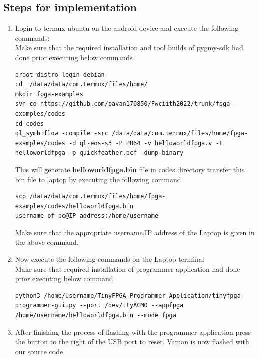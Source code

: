 \documentclass[10pt, a4paper]{article}
\begin{document}
\subsection{Steps for implementation}
\begin{enumerate}
\item Login to termux-ubuntu on the android device and execute the following commands:\\
Make sure that the required installation and tool builds of pygmy-sdk had done prior executing below commands
\begin{lstlisting}
proot-distro login debian
cd  /data/data/com.termux/files/home/
mkdir fpga-examples
svn co https://github.com/pavan170850/Fwciith2022/trunk/fpga-examples/codes
cd codes
ql_symbiflow -compile -src /data/data/com.termux/files/home/fpga-examples/codes -d ql-eos-s3 -P PU64 -v helloworldfpga.v -t helloworldfpga -p quickfeather.pcf -dump binary
\end{lstlisting}
This will generate \textbf{helloworldfpga.bin} file in codes directory transfer this bin file to laptop by executing the following command
\begin{lstlisting}
scp /data/data/com.termux/files/home/fpga-examples/codes/helloworldfpga.bin username_of_pc@IP_address:/home/username
\end{lstlisting}
Make sure that the appropriate username,IP address of the Laptop is given in the above command.
\item Now execute the following commands on the Laptop terminal\\
Make sure that required installation of programmer application had done prior executing below command
\begin{lstlisting}
python3 /home/username/TinyFPGA-Programmer-Application/tinyfpga-programmer-gui.py --port /dev/ttyACM0 --appfpga /home/username/helloworldfpga.bin --mode fpga
\end{lstlisting}
\item After finishing the process of flashing with the programmer application press the button to the right of the USB port to reset. Vaman is now flashed with our source code
\end{enumerate}



\end{document}
